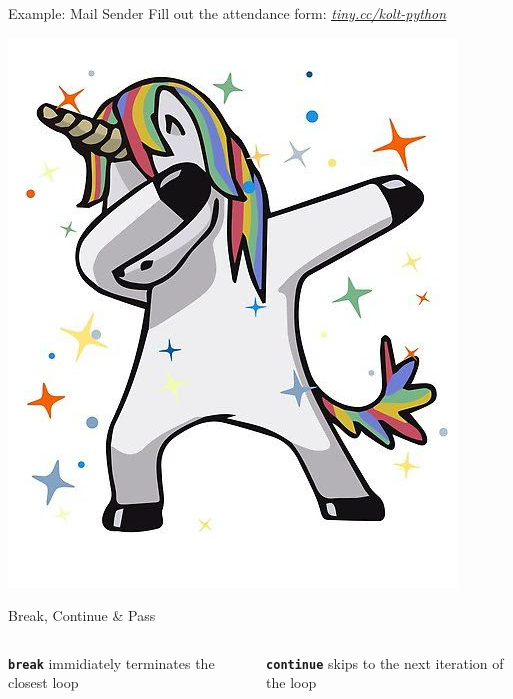         \begin{frame}{Example: Mail Sender}
            \pause
            \LARGE
            Fill out the attendance form: \href{https://tiny.cc/kolt-python}{\underline{\textit{tiny.cc/kolt-python}}} 
            \begin{center}
                \includegraphics[height=0.65\textheight]{images/unicorn.jpg}                
            \end{center}
        
        \end{frame}

        \begin{frame}{Break, Continue \& Pass}
            \begin{columns}
                \begin{column}{0.5\textwidth}
                    \textbf{\texttt{break}} immidiately terminates the closest loop
                    \bigskip  
                    \inputminted[frame=single,framesep=2pt]{python3}{../Lecture3/code-examples/break1.py}
                    \pause
                    \inputminted[frame=single,framesep=2pt]{python3}{../Lecture3/code-examples/break2.py}
                \end{column}
               \pause 
                \begin{column}{0.5\textwidth}
                    \textbf{\texttt{continue}} skips to the next iteration of the loop
                    \bigskip  
                    \inputminted[frame=single,framesep=2pt]{python3}{../Lecture3/code-examples/continue1.py}
                    \pause
                    \inputminted[frame=single,framesep=2pt]{python3}{../Lecture3/code-examples/continue2.py}
                \end{column} 
            \end{columns}
        \end{frame}
        
